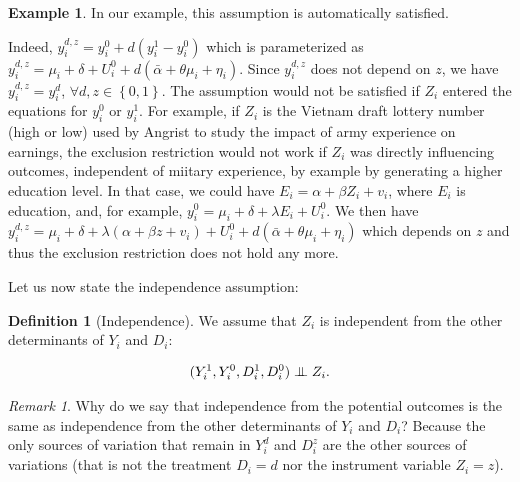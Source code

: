 \documentclass[
]{book}
\newcommand\Ind{\protect\mathpalette{\protect\independenT}{\perp}}
\def\independenT#1#2{\mathrel{\setbox0\hbox{$#1#2$}\copy0\kern-\wd0\mkern4mu\box0}}
\theoremstyle{definition}
\newtheorem{definition}{Definition}[chapter]
\theoremstyle{definition}
\newtheorem{example}{Example}[chapter]
\theoremstyle{definition}
\theoremstyle{definition}
\theoremstyle{remark}
\newtheorem*{remark}{Remark}
\begin{document}
\begin{example}
\protect\hypertarget{exm:unnamed-chunk-141}{}{\label{exm:unnamed-chunk-141} }In our example, this assumption is automatically satisfied.
\end{example}
Indeed, \(y_i^{d,z}=y_i^0 + d(y_i^1-y_i^0)\) which is parameterized as \(y_i^{d,z}=\mu_i+\delta+U_i^0+d(\bar{\alpha}+\theta\mu_i+\eta_i)\).
Since \(y_i^{d,z}\) does not depend on \(z\), we have \(y_i^{d,z} = y_i^d\), \(\forall d,z \in \left\{0,1\right\}\).
The assumption would not be satisfied if \(Z_i\) entered the equations for \(y_i^0\) or \(y_i^1\).
For example, if \(Z_i\) is the Vietnam draft lottery number (high or low) used by Angrist to study the impact of army experience on earnings, the exclusion restriction would not work if \(Z_i\) was directly influencing outcomes, independent of miitary experience, by example by generating a higher education level.
In that case, we could have \(E_i=\alpha+\beta Z_i + v_i\), where \(E_i\) is education, and, for example, \(y_i^0=\mu_i+\delta+\lambda E_i+U_i^0\).
We then have \(y_i^{d,z}=\mu_i+\delta +\lambda(\alpha+\beta z + v_i) +U_i^0+d(\bar{\alpha}+\theta\mu_i+\eta_i)\) which depends on \(z\) and thus the exclusion restriction does not hold any more.

Let us now state the independence assumption:

\begin{definition}[Independence]
\protect\hypertarget{def:Independence}{}{\label{def:Independence} \iffalse (Independence) \fi{} }We assume that \(Z_i\) is independent from the other determinants of \(Y_i\) and \(D_i\):

\begin{align*}
(Y_i^1,Y_i^0,D_i^1,D_i^0)\Ind Z_i.
\end{align*}
\end{definition}

\begin{remark}
\iffalse{} {Remark. } \fi{}Why do we say that independence from the potential outcomes is the same as independence from the other determinants of \(Y_i\) and \(D_i\)?
Because the only sources of variation that remain in \(Y_i^d\) and \(D_i^z\) are the other sources of variations (that is not the treatment \(D_i=d\) nor the instrument variable \(Z_i=z\)).
\end{remark}
\end{document}
